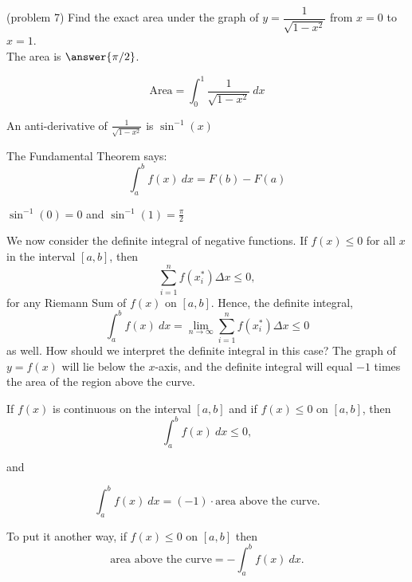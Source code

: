 \documentclass[handout]{ximera}
\begin{document}
\begin{problem}(problem 7)
Find the exact area under the graph of $y = \dfrac{1}{\sqrt{1-x^2}}$ from $x = 0$ to $x = 1$.\\
The area is $\answer{\pi/2}$.
 \begin{hint}
  \[
  \text{Area} =  \int_0^1 \frac{1}{\sqrt{1-x^2}} \ dx
  \]
 \end{hint} 
    \begin{hint}
      An anti-derivative of $\frac{1}{\sqrt{1-x^2}}$ is $\sin^{-1}(x)$
    \end{hint}
    
    \begin{hint}
      The Fundamental Theorem says:
      \[
      \int_a^b f(x) \ dx = F(b) - F(a)
      \]
    \end{hint}    
		\begin{hint}
      $\sin^{-1}(0) = 0$ and $\sin^{-1}(1) = \frac{\pi}{2}$ 
    \end{hint}
		
		
\end{problem}


We now consider the definite integral of negative functions.
If $f(x) \leq 0$ for all $x$ in the interval $[a,b]$, then 
\[\sum_{i=1}^n f(x_i^*) \Delta x \leq 0,\]
for any Riemann Sum of $f(x)$ on $[a, b]$.
Hence, the definite integral,
\[
\int_a^b f(x) \ dx = \lim_{n \to \infty} \sum_{i=1}^n f(x_i^*) \Delta x \leq 0
\]
as well. How should we interpret the definite integral in this case? The graph of $y = f(x)$ will lie below the $x$-axis, 
and the definite integral will equal $-1$ times the area of the region above the curve. 

\begin{proposition}
If $f(x)$ is continuous on the interval $[a, b]$ and if $f(x) \leq 0$ on $[a,b]$,
then 
\[ \int_a^b f(x) \ dx \leq 0,\]

and 

\[\int_a^b f(x) \ dx = (-1) \cdot \text{area above the curve}.\]
\end{proposition}

To put it another way, if $f(x) \leq 0$ on $[a,b]$ then
\[\text{area above the curve} = -\int_a^b f(x) \ dx.\]
\end{document}
